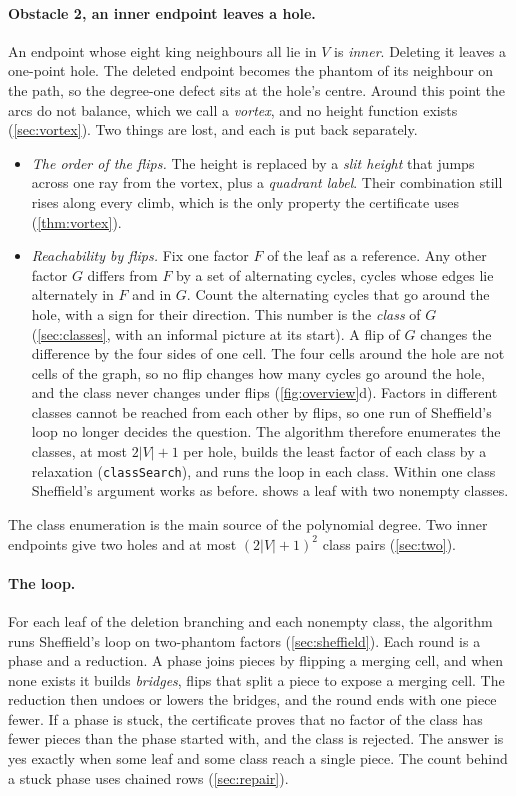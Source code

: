 \documentclass[11pt]{article}
\theoremstyle{plain}
\theoremstyle{definition}
\theoremstyle{remark}
\newcommand{\lean}[1]{\texttt{#1}}
\begin{document}
\paragraph{Obstacle 2, an inner endpoint leaves a hole.}
An endpoint whose eight king neighbours all lie in $V$ is \emph{inner}.
Deleting it leaves a one-point hole.
The deleted endpoint becomes the phantom of its neighbour on the path, so the degree-one defect
sits at the hole's centre.
Around this point the arcs do not balance, which we call a \emph{vortex}, and no height function
exists (\cref{sec:vortex}).
Two things are lost, and each is put back separately.
\begin{itemize}
\item \emph{The order of the flips.}
  The height is replaced by a \emph{slit height} that jumps across one ray from the vortex, plus a
  \emph{quadrant label}.
  Their combination still rises along every climb, which is the only property the certificate
  uses (\cref{thm:vortex}).
\item \emph{Reachability by flips.}
  Fix one factor $F$ of the leaf as a reference.
  Any other factor $G$ differs from $F$ by a set of alternating cycles, cycles whose edges lie
  alternately in $F$ and in $G$.
  Count the alternating cycles that go around the hole, with a sign for their direction.
  This number is the \emph{class} of $G$ (\cref{sec:classes}, with an informal picture at its
  start).
  A flip of $G$ changes the difference by the four sides of one cell.
  The four cells around the hole are not cells of the graph, so no flip changes how many cycles go
  around the hole, and the class never changes under flips (\cref{fig:overview}d).
  Factors in different classes cannot be reached from each other by flips, so one run of Sheffield's
  loop no longer decides the question.
  The algorithm therefore enumerates the classes, at most $2|V|+1$ per hole, builds the least factor
  of each class by a relaxation (\lean{classSearch}), and runs the loop in each class.
  Within one class Sheffield's argument works as before.
   shows a leaf with two nonempty classes.
\end{itemize}
The class enumeration is the main source of the polynomial degree.
Two inner endpoints give two holes and at most $(2|V|+1)^2$ class pairs (\cref{sec:two}).

\paragraph{The loop.}
For each leaf of the deletion branching and each nonempty class, the algorithm runs Sheffield's
loop on two-phantom factors (\cref{sec:sheffield}).
Each round is a phase and a reduction.
A phase joins pieces by flipping a merging cell, and when none exists it builds \emph{bridges},
flips that split a piece to expose a merging cell.
The reduction then undoes or lowers the bridges, and the round ends with one piece fewer.
If a phase is stuck, the certificate proves that no factor of the class has fewer pieces than the
phase started with, and the
class is rejected.
The answer is yes exactly when some leaf and some class reach a single piece.
The count behind a stuck phase uses chained rows (\cref{sec:repair}).
\end{document}
